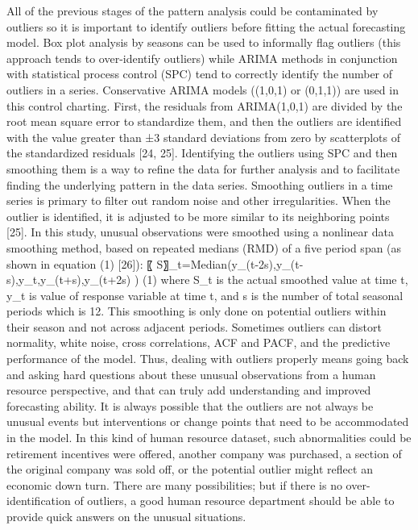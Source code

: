 All of the previous stages of the pattern analysis could be contaminated by outliers so it is important to identify outliers before fitting the actual forecasting model. Box plot analysis by seasons can be used to informally flag outliers (this approach tends to over-identify outliers) while ARIMA methods in conjunction with statistical process control (SPC) tend to correctly identify the number of outliers in a series. Conservative ARIMA models ((1,0,1) or (0,1,1))  are used in this control charting. First, the residuals from ARIMA(1,0,1) are divided by the root mean square error to standardize them, and then the outliers are identified with the value greater than ±3 standard deviations from zero by scatterplots of the standardized residuals [24, 25]. Identifying the outliers using SPC and then smoothing them is a way to refine the data for further analysis and to facilitate finding the underlying pattern in the data series. Smoothing outliers in a time series is primary to filter out random noise and other irregularities. When the outlier is identified, it is adjusted to be more similar to its neighboring points [25]. In this study, unusual observations were smoothed using a nonlinear data smoothing method, based on repeated medians (RMD) of a five period span (as shown in equation (1) [26]):
〖                                                   S〗_t=Median(y_(t-2s),y_(t-s),y_t,y_(t+s),y_(t+2s) )                                 (1)
where S_t  is the actual smoothed value at time t, y_t is value of response variable at time t, and s is the number of total seasonal periods which is 12. This smoothing is only done on potential outliers within their season and not across adjacent periods. Sometimes outliers can distort normality, white noise, cross correlations, ACF and PACF, and the predictive performance of the model.  Thus, dealing with outliers properly means going back and asking hard questions about these unusual observations from a human resource perspective, and that can truly add understanding and improved forecasting ability.  It is always possible that the outliers are not always be unusual events but interventions or change points that need to be accommodated in the model.  In this kind of human resource dataset, such abnormalities could be retirement incentives were offered, another company was purchased, a section of the original company was sold off, or the potential outlier might reflect an economic down turn.  There are many possibilities; but if there is no over-identification of outliers, a good human resource department should be able to provide quick answers on the unusual situations.
